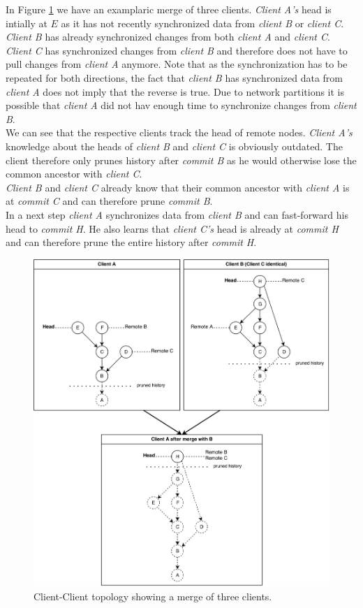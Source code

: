 In Figure \ref{fig:histo.topologies.client-client} we have an examplaric merge of three clients.
\emph{Client A's} head is intially at $ E $ as it has not recently synchronized data from \emph{client B} or \emph{client C}.
\emph{Client B} has already synchronized changes from both \emph{client A} and \emph{client C}.
\emph{Client C} has synchronized changes from \emph{client B} and therefore does not have to pull changes from \emph{client A} anymore.
Note that as the synchronization has to be repeated for both directions, the fact that \emph{client B} has synchronized data from \emph{client A} does not imply that the reverse is true.
Due to network partitions it is possible that \emph{client A} did not hav enough time to synchronize changes from \emph{client B}.\\
We can see that the respective clients track the head of remote nodes.
\emph{Client A's} knowledge about the heads of \emph{client B} and \emph{client C} is obviously outdated.
The client therefore only prunes history after \emph{commit B} as he would otherwise lose the common ancestor with \emph{client C}.\\
\emph{Client B} and \emph{client C} already know that their common ancestor with \emph{client A} is at \emph{commit C} and can therefore prune \emph{commit B}.\\
In a next step \emph{client A} synchronizes data from \emph{client B} and can fast-forward his head to \emph{commit H}.
He also learns that \emph{client C's} head is already at \emph{commit H} and can therefore prune the entire history after \emph{commit H}.

\begin{figure}[!ht]
  \centering
  \includegraphics[width=1.0\textwidth]{img/client-client}
  \caption{Client-Client topology showing a merge of three clients.}
  \label{fig:histo.topologies.client-client}
\end{figure}

